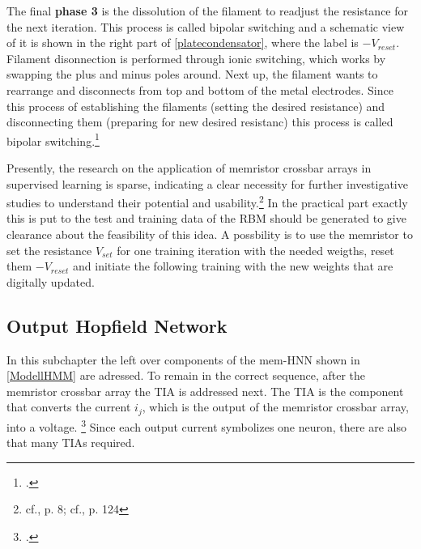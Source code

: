 The final \textbf{phase 3} is the dissolution of the filament to readjust the resistance for the next iteration.
This process is called bipolar switching and a schematic view of it is shown in the right part of \ref{platecondensator}, where the label is \(-V_{reset}\).
Filament disonnection is performed through ionic switching, which works by swapping the plus and minus poles around.
Next up, the filament wants to rearrange and disconnects from top and bottom of the metal electrodes. 
Since this process of establishing the filaments (setting the desired resistance) and disconnecting them (preparing for new desired resistanc) this process is called bipolar switching.\footcite[cf.][7]{sungPerspectiveReviewMemristive2018}

Presently, the research on the application of memristor crossbar arrays in supervised learning is sparse, indicating a clear necessity for further investigative studies to understand their potential and usability.\footnote{cf.\cite{amirsoleimaniInMemoryVectorMatrixMultiplication2020}, p. 8; cf.\cite{sungPerspectiveReviewMemristive2018}, p. 124}
In the practical part exactly this is put to the test and training data of the \ac{RBM} should be generated to give clearance about the feasibility of this idea.
A possbility is to use the memristor to set the resistance \(V_{set}\) for one training iteration with the needed weigths, reset them \(-V_{reset}\) and 
initiate the following training with the new weights that are digitally updated. 

\subsection{Output Hopfield Network}

In this subchapter the left over components of the \ac{mem-HNN} shown in \ref{ModellHMM} are adressed.
To remain in the correct sequence, after the memristor crossbar array the \ac{TIA} is addressed next.
The \ac{TIA} is the component that converts the current \(i_j\), which is the output of the memristor crossbar array, into a voltage. \footcite[cf.][3]{hizzaniMemristorbasedHardwareAlgorithms2023}
Since each output current symbolizes one neuron, there are also that many \ac{TIA}s required.

